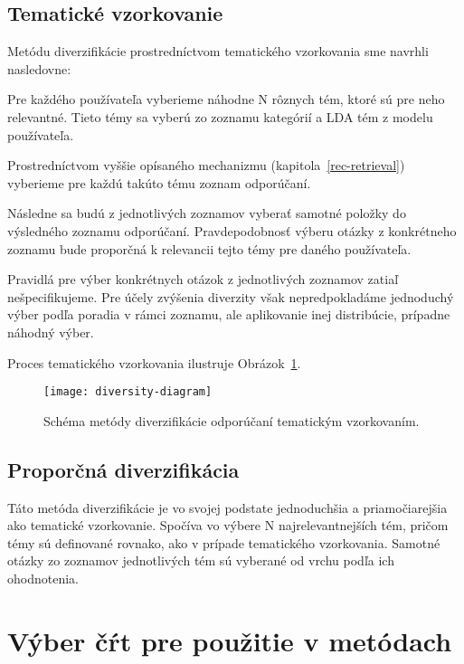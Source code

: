 \subsection{Tematické vzorkovanie}
Metódu diverzifikácie prostredníctvom tematického vzorkovania sme navrhli nasledovne:

\begin{my_enumerate}
\item{
  Pre každého používateľa vyberieme náhodne N rôznych tém, ktoré sú pre neho relevantné. Tieto témy sa vyberú zo zoznamu
  kategórií a LDA tém z modelu používateľa.
}
\item{
  Prostredníctvom vyššie opísaného mechanizmu (kapitola~\ref{rec-retrieval}) vyberieme pre každú takúto tému zoznam
  odporúčaní.
}
\item{
  Následne sa budú z jednotlivých zoznamov vyberať samotné položky do výsledného zoznamu odporúčaní. Pravdepodobnosť výberu
  otázky z konkrétneho zoznamu bude proporčná k relevancii tejto témy pre daného používateľa.
}
\item{
  Pravidlá pre výber konkrétnych otázok z jednotlivých zoznamov zatiaľ nešpecifikujeme. Pre účely zvýšenia diverzity však
  nepredpokladáme jednoduchý výber podľa poradia v rámci zoznamu, ale aplikovanie inej distribúcie, prípadne náhodný výber.
}
\end{my_enumerate}

Proces tematického vzorkovania ilustruje Obrázok~\ref{fig:tematic-sampling}.

\begin{figure}[H]\begin{center}
\texttt{[image: diversity-diagram]}
\caption{Schéma metódy diverzifikácie odporúčaní tematickým vzorkovaním.\label{fig:tematic-sampling}}\end{center}
\end{figure}


\subsection{Proporčná diverzifikácia}
Táto metóda diverzifikácie je vo svojej podstate jednoduchšia a priamočiarejšia ako tematické vzorkovanie. Spočíva
vo výbere N najrelevantnejších tém, pričom témy sú definované rovnako, ako v prípade tematického vzorkovania.
Samotné otázky zo zoznamov jednotlivých tém sú vyberané od vrchu podľa ich ohodnotenia.


\section{Výber čŕt pre použitie v metódach}\label{features}

